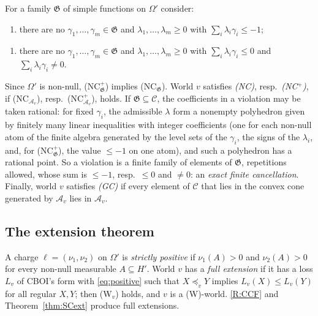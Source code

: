 \documentclass[11pt]{article}
\theoremstyle{definition}\newtheorem{definition}[theorem]{Definition}
\theoremstyle{remark}\newtheorem{remark}[theorem]{Remark}
\begin{document}
For a family $\mathfrak G$ of simple functions on $\Omega'$ consider:
\begin{enumerate}[label=(NC$_{\mathfrak G}$),leftmargin=*,itemsep=2pt]
\item there are no $\gamma_1,\dots,\gamma_m\in\mathfrak G$ and
$\lambda_1,\dots,\lambda_m\ge0$ with $\sum_i\lambda_i\gamma_i\le-1$;
\end{enumerate}
\begin{enumerate}[label=(NC$^+_{\mathfrak G}$),leftmargin=*,itemsep=2pt]
\item there are no $\gamma_1,\dots,\gamma_m\in\mathfrak G$ and
$\lambda_1,\dots,\lambda_m\ge0$ with $\sum_i\lambda_i\gamma_i\le0$ and
$\sum_i\lambda_i\gamma_i\ne0$.
\end{enumerate}
Since $\Omega'$ is non-null, (NC$^+_{\mathfrak G}$) implies
(NC$_{\mathfrak G}$). World $v$ satisfies \emph{(NC)}, resp.\
\emph{(NC$^+$)}, if (NC$_{\mathcal A_v}$), resp.\ (NC$^+_{\mathcal A_v}$),
holds. If $\mathfrak G\subseteq\mathcal C$, the coefficients in a violation
may be taken rational: for fixed $\gamma_i$, the admissible $\lambda$ form a
nonempty polyhedron given by finitely many linear inequalities with integer
coefficients (one for each non-null atom of the finite algebra generated by
the level sets of the $\gamma_i$, the signs of the $\lambda_i$, and, for
(NC$^+_{\mathfrak G}$), the value $\le-1$ on one atom), and such a
polyhedron has a rational point. So a violation is a finite family of
elements of $\mathfrak G$, repetitions allowed, whose sum is $\le-1$, resp.\
$\le0$ and $\ne0$: an \emph{exact finite cancellation}. Finally, world $v$
satisfies \emph{(GC)} if every element of $\mathcal C$ that lies in the
convex cone generated by $\mathcal A_v$ lies in $\mathcal A_v$.

\subsection{The extension theorem}\label{sec:NCthm}

A charge $\ell=(\nu_1,\nu_2)$ on $\Omega'$ is \emph{strictly positive} if
$\nu_1(A)>0$ and $\nu_2(A)>0$ for every non-null measurable $A\subseteq H'$.
World $v$ has a \emph{full extension} if it has a loss $L_v$ of CBOI's form
with \eqref{eq:positive} such that $X\preceq_vY$ implies $L_v(X)\le L_v(Y)$
for all regular $X,Y$; then (W$_v$) holds, and $v$ is a (W)-world.
\ref{R:CCF} and Theorem~\ref{thm:SCext} produce full extensions.
\end{document}
